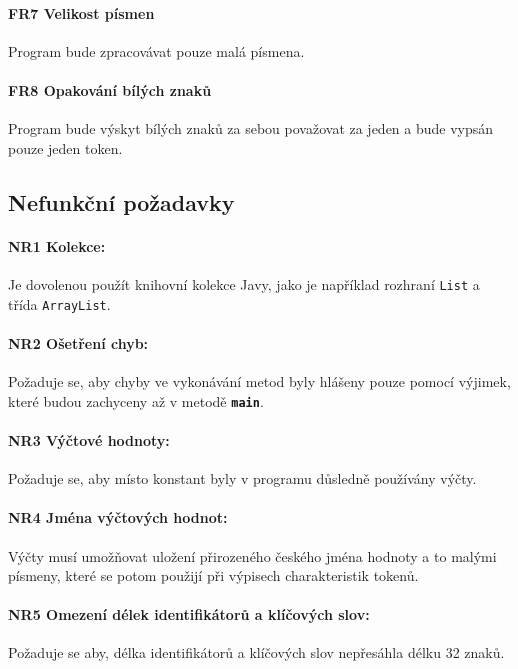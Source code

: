 \paragraph {FR7 Velikost písmen} Program bude zpracovávat pouze malá písmena.

\paragraph {FR8 Opakování bílých znaků} Program bude výskyt bílých znaků za sebou považovat za jeden a bude vypsán pouze jeden token.






\subsection{Nefunkční požadavky}

\paragraph {NR1 Kolekce:} Je dovolenou použít knihovní kolekce Javy, jako je například rozhraní \lstinline|List| a třída \lstinline|ArrayList|.


\paragraph {NR2 Ošetření chyb:} Požaduje se, aby chyby ve vykonávání metod byly hlášeny pouze pomocí výjimek, které budou zachyceny až v metodě \textbf{\texttt{main}}.

\paragraph {NR3 Výčtové hodnoty:} Požaduje se, aby místo konstant byly v programu důsledně používány výčty. 

\paragraph {NR4 Jména výčtových hodnot:} Výčty musí umožňovat uložení přirozeného českého jména hodnoty a to malými písmeny, které se potom použijí při výpisech charakteristik tokenů.

\paragraph {NR5 Omezení délek identifikátorů a klíčových slov:} Požaduje se aby, délka identifikátorů a klíčových slov nepřesáhla délku 32 znaků.

